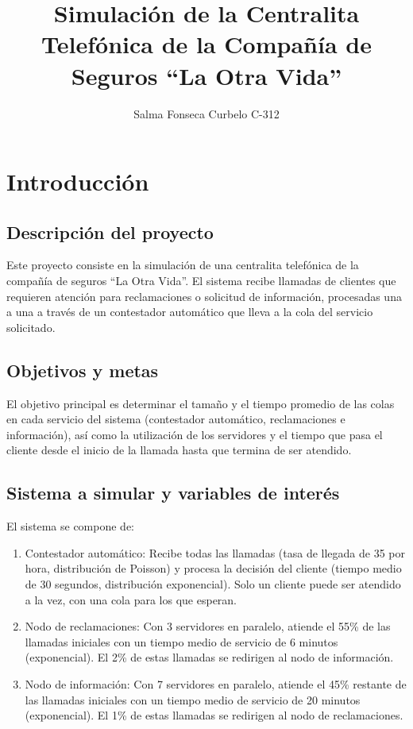 \documentclass[12pt]{article}
\title{Simulación de la Centralita Telefónica de la Compañía de Seguros “La Otra Vida”}
\author{Salma Fonseca Curbelo C-312}
\begin{document}
\maketitle
\newpage

\section{Introducción}

\subsection{Descripción del proyecto}
Este proyecto consiste en la simulación de una centralita telefónica de la compañía de seguros “La Otra Vida”. El sistema recibe llamadas de clientes que requieren atención para reclamaciones o solicitud de información, procesadas una a una a través de un contestador automático que lleva a la cola del servicio solicitado.

\subsection{Objetivos y metas}
El objetivo principal es determinar el tamaño y el tiempo promedio de las colas en cada servicio del sistema (contestador automático, reclamaciones e información), así como la utilización de los servidores y el tiempo que pasa el cliente desde el inicio de la llamada hasta que termina de ser atendido.

\subsection{Sistema a simular y variables de interés}
El sistema se compone de:
\begin{enumerate}
    \item Contestador automático: Recibe todas las llamadas (tasa de llegada de 35 por hora, distribución de Poisson) y procesa la decisión del cliente (tiempo medio de 30 segundos, distribución exponencial). Solo un cliente puede ser atendido a la vez, con una cola para los que esperan.
    \item Nodo de reclamaciones: Con 3 servidores en paralelo, atiende el 55\% de las llamadas iniciales con un tiempo medio de servicio de 6 minutos (exponencial). El 2\% de estas llamadas se redirigen al nodo de información.
    \item Nodo de información: Con 7 servidores en paralelo, atiende el 45\% restante de las llamadas iniciales con un tiempo medio de servicio de 20 minutos (exponencial). El 1\% de estas llamadas se redirigen al nodo de reclamaciones.
\end{enumerate}
\end{document}
